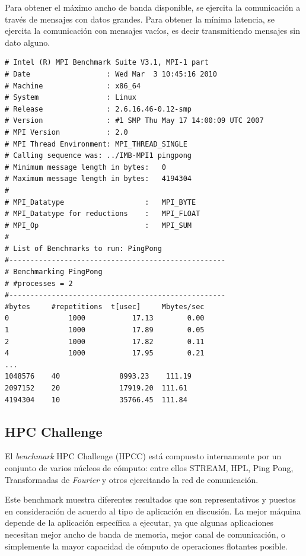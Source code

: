 \documentclass[a4paper]{report}
\begin{document}
\bigskip

Para obtener el máximo ancho de banda disponible, se ejercita la comunicación a través de mensajes con datos grandes. Para obtener la mínima latencia, se ejercita la comunicación con mensajes vacíos, es decir transmitiendo mensajes sin dato alguno.

{\small
\begin{verbatim}
# Intel (R) MPI Benchmark Suite V3.1, MPI-1 part
# Date                  : Wed Mar  3 10:45:16 2010
# Machine               : x86_64
# System                : Linux
# Release               : 2.6.16.46-0.12-smp
# Version               : #1 SMP Thu May 17 14:00:09 UTC 2007
# MPI Version           : 2.0
# MPI Thread Environment: MPI_THREAD_SINGLE
# Calling sequence was: ../IMB-MPI1 pingpong
# Minimum message length in bytes:   0
# Maximum message length in bytes:   4194304
#
# MPI_Datatype                   :   MPI_BYTE
# MPI_Datatype for reductions    :   MPI_FLOAT
# MPI_Op                         :   MPI_SUM
#
# List of Benchmarks to run: PingPong
#---------------------------------------------------
# Benchmarking PingPong
# #processes = 2
#---------------------------------------------------
#bytes     #repetitions  t[usec]     Mbytes/sec
0              1000           17.13        0.00
1              1000           17.89        0.05
2              1000           17.82        0.11
4              1000           17.95        0.21
...
1048576    40              8993.23    111.19
2097152    20              17919.20  111.61
4194304    10              35766.45  111.84
\end{verbatim}
}

\subsection{HPC Challenge}

El {\it benchmark} HPC Challenge \cite{hpcc} (HPCC) está compuesto internamente por un conjunto de
varios núcleos de cómputo: entre ellos STREAM, HPL, Ping Pong, Transformadas de {\it Fourier}
y otros ejercitando la red de comunicación.

\bigskip

Este benchmark muestra diferentes resultados que son representativos
y puestos en consideración de acuerdo al tipo de aplicación en discusión.
La mejor máquina depende de la aplicación específica a ejecutar, ya que algunas
aplicaciones necesitan mejor ancho de banda de memoria, mejor canal de comunicación, o
simplemente la mayor capacidad de cómputo de operaciones flotantes posible.
\end{document}
